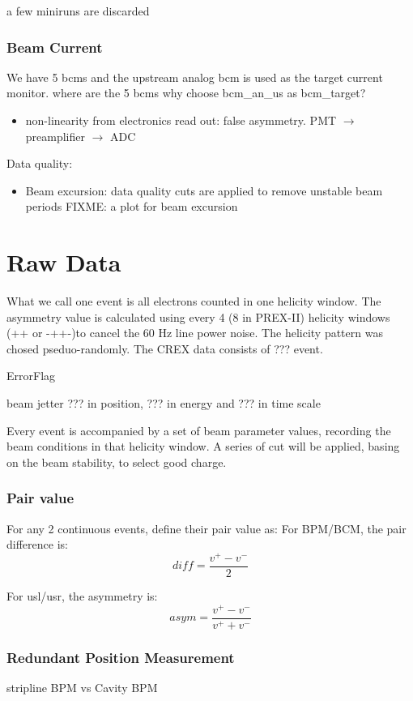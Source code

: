 a few miniruns are discarded
\subsubsection{Beam Current}
We have 5 bcms and the upstream analog bcm is used as the target current monitor.
where are the 5 bcms
why choose bcm\_an\_us as bcm\_target?

\begin{itemize}
    \item non-linearity from electronics read out: false asymmetry. PMT $\rightarrow$
	preamplifier $\rightarrow$ ADC
\end{itemize}

Data quality:
\begin{itemize}
    \item Beam excursion: data quality cuts are applied to remove unstable beam periods
	FIXME: a plot for beam excursion
\end{itemize}

\section{Raw Data}
What we call one event is all electrons counted in one helicity window.
The asymmetry value is calculated using every 4 (8 in PREX-II) helicity windows
(+\-\-+ or -++-)to cancel the 60 Hz line power noise. The helicity pattern was
chosed pseduo-randomly. The CREX data consists of ??? event.

ErrorFlag 

beam jetter ??? in position, ??? in energy and ??? in time scale

Every event
is accompanied by a set of beam parameter values, recording the beam conditions
in that helicity window. A series of cut will be applied, basing on the beam
stability, to select good charge.

\subsubsection{Pair value}
For any 2 continuous events, define their pair value as:
For BPM/BCM, the pair difference is:
$$ diff = \frac{v^+ - v^-}{2} $$

For usl/usr, the asymmetry is:
$$ asym = \frac{v^+ - v^-}{v^+ + v^-} $$

\subsubsection{Redundant Position Measurement}
stripline BPM vs Cavity BPM

